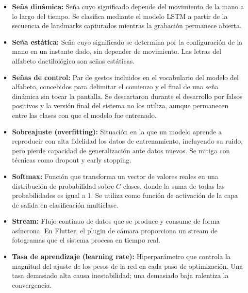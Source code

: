 \begin{itemize}
    \item[] \textbf{Seña dinámica:} Seña cuyo significado depende del movimiento de la mano a lo largo del tiempo. Se clasifica mediante el modelo LSTM a partir de la secuencia de landmarks capturados mientras la grabación permanece abierta.\\

    \item[] \textbf{Seña estática:} Seña cuyo significado se determina por la configuración de la mano en un instante dado, sin depender de movimiento. Las letras del alfabeto dactilológico son señas estáticas.\\

    \item[] \textbf{Señas de control:} Par de gestos incluidos en el vocabulario del modelo del alfabeto, concebidos para delimitar el comienzo y el final de una seña dinámica sin tocar la pantalla. Se descartaron durante el desarrollo por falsos positivos y la versión final del sistema no los utiliza, aunque permanecen entre las clases con que el modelo fue entrenado.\\

    \item[] \textbf{Sobreajuste (overfitting):} Situación en la que un modelo aprende a reproducir con alta fidelidad los datos de entrenamiento, incluyendo su ruido, pero pierde capacidad de generalización ante datos nuevos. Se mitiga con técnicas como dropout y early stopping.\\

    \item[] \textbf{Softmax:} Función que transforma un vector de valores reales en una distribución de probabilidad sobre $C$ clases, donde la suma de todas las probabilidades es igual a 1. Se utiliza como función de activación de la capa de salida en clasificación multiclase.\\

    \item[] \textbf{Stream:} Flujo continuo de datos que se produce y consume de forma asíncrona. En Flutter, el plugin de cámara proporciona un stream de fotogramas que el sistema procesa en tiempo real.\\

    \item[] \textbf{Tasa de aprendizaje (learning rate):} Hiperparámetro que controla la magnitud del ajuste de los pesos de la red en cada paso de optimización. Una tasa demasiado alta causa inestabilidad; una demasiado baja ralentiza la convergencia.\\


\end{itemize}
